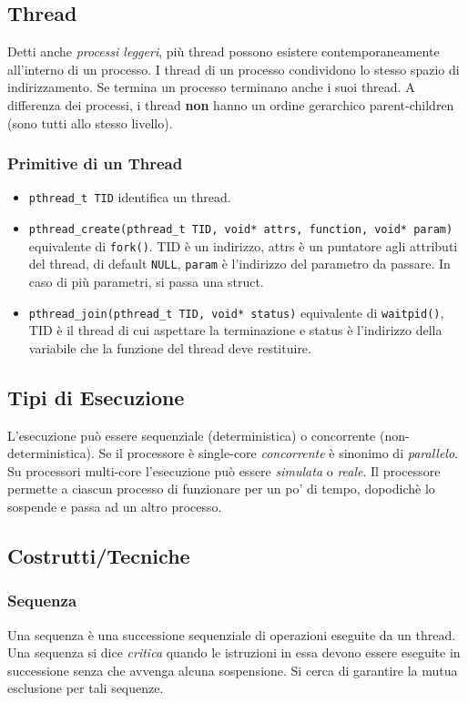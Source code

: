 \documentclass[10pt,a4paper]{article}
\newcommand{\code}{\texttt}
\begin{document}
    \subsection{Thread} Detti anche \emph{processi leggeri}, più thread possono esistere contemporaneamente all'interno di un processo. I thread di un processo condividono lo stesso spazio di indirizzamento. Se termina un processo terminano anche i suoi thread. A differenza dei processi, i thread \textbf{non} hanno un ordine gerarchico parent-children (sono tutti allo stesso livello).
    \subsubsection{Primitive di un Thread}
    \begin{itemize}
        \item \code{pthread\_t TID} identifica un thread.
        \item \code{pthread\_create(pthread\_t TID, void* attrs, function, void* param)} equivalente di \code{fork()}. TID è un indirizzo, attrs è un puntatore agli attributi del thread, di default \code{NULL}, \code{param} è l'indirizzo del parametro da passare. In caso di più parametri, si passa una struct.
        \item \code{pthread\_join(pthread\_t TID, void* status)} equivalente di \code{waitpid()}, TID è il thread di cui aspettare la terminazione e status è l'indirizzo della variabile che la funzione del thread deve restituire.
    \end{itemize}
    \subsection{Tipi di Esecuzione}
    L'esecuzione può essere sequenziale (deterministica) o concorrente (non-deterministica). Se il processore è single-core \emph{concorrente} è sinonimo di \emph{parallelo}. Su processori multi-core l'esecuzione può essere \emph{simulata} o \emph{reale}. Il processore permette a ciascun processo di funzionare per un po' di tempo, dopodichè lo sospende e passa ad un altro processo.
    \subsection{Costrutti/Tecniche}
    \subsubsection{Sequenza}
    Una sequenza è una successione sequenziale di operazioni eseguite da un thread. Una sequenza si dice \emph{critica} quando le istruzioni in essa devono essere eseguite in successione senza che avvenga alcuna sospensione. Si cerca di garantire la mutua esclusione per tali sequenze.
\end{document}
